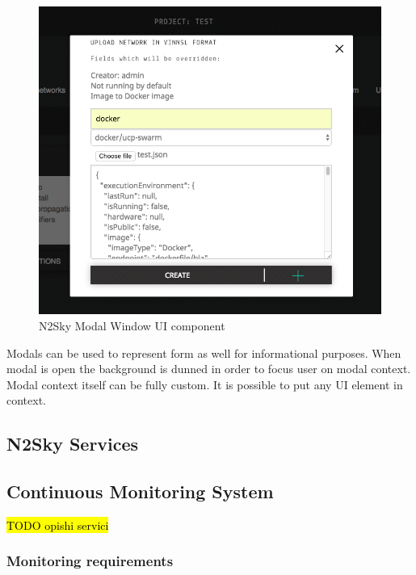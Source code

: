 \begin{description}
 \begin{figure}[htbp]
\begin{center}
  \includegraphics[scale=0.65]{components/3/components/modal.png}
  \caption{N2Sky Modal Window UI component}
  \label{fig:modal}
\end{center}
\end{figure}

Modals can be used to represent form as well for informational purposes. When modal is open the background is dunned in order to focus user on modal context. Modal context itself can be fully custom. It is possible to put any UI element in context.



\end{description}



\subsection{N2Sky Services}\label{N2Sky Services}

\subsection{Continuous Monitoring System}\label{Continuous Monitoring System}
\hl{TODO opishi servici }
\subsubsection{Monitoring requirements}\label{Monitoring requirements}

